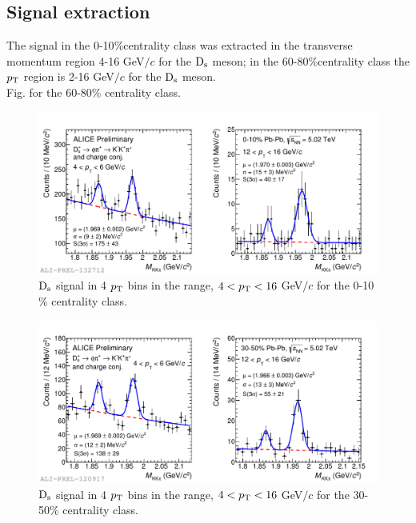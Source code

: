 \subsection{Signal extraction}
 The signal in the 0-10$\%$centrality class was extracted in the transverse
momentum region 4-16 GeV$/c$ for the ${\rm D_s}$ meson; in the 60-80$\%$centrality class the $p_{\rm T}$ region is 2-16 GeV$/c$ for the ${\rm D_s}$ meson.\\
Fig. for the 60-80$\%$ centrality class.

\begin{figure}[!htbp]
 \begin{center}
  \includegraphics[width=.9\textwidth]{FigCap5/MassDs_PbPb010_5TeV_pt_4-6_12-16.pdf}
\end{center}
 \caption{${\rm D_s}$ signal in 4 $p_{\rm T}$ bins in the range, $4<p_{\rm T}<16$ GeV$/c$ for the 0-10$\%$ centrality class. }
 \label{FigInvMassDs_010} 
\end{figure} 
 
\begin{figure}[!htbp]
 \begin{center}
  \includegraphics[width=.9\textwidth]{FigCap5/MassDs_PbPb3050_5TeV_pt_4-6_12-16.pdf}
\end{center}
 \caption{${\rm D_s}$ signal in 4 $p_{\rm T}$ bins in the range, $4<p_{\rm T}<16$ GeV$/c$ for the 30-50$\%$ centrality class. }
 \label{FigInvMassDs_3050} 
\end{figure} 
 
